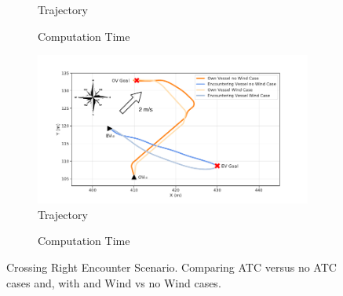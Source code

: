         \begin{figure}[H]
        \centering
        
            \begin{subfigure}[b]{0.49\textwidth}
                \centering
                
                \caption{Trajectory}
                \label{fig:plot_cl_w_vs_wo}
            \end{subfigure}
            \begin{subfigure}[b]{0.49\textwidth}
                \centering
                
                \caption{Computation Time}
                \label{fig:plot_cl_w_vs_wo_CT}
            \end{subfigure}
            
            \begin{subfigure}[b]{0.49\textwidth}
                \centering
                \includegraphics[width=\textwidth]{figs/Chap5/plot_cl_w_vs_wind.pdf}
                \caption{Trajectory}
                \label{fig:plot_cl_w_vs_wind}
            \end{subfigure}
            \begin{subfigure}[b]{0.49\textwidth}
                \centering
                
                \caption{Computation Time}
                \label{fig:plot_cl_w_vs_wind_CT}
            \end{subfigure}
        
        \caption{Crossing Right Encounter Scenario. Comparing \ac{ATC} versus no \ac{ATC} cases and, with and Wind vs no Wind cases.}
        \label{fig:plots_cl}
        \end{figure}
      
